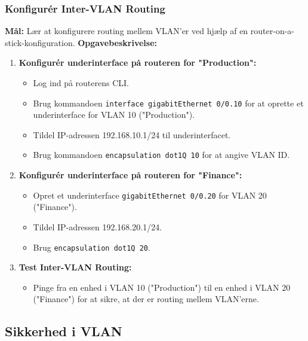 \subsubsection*{Konfigurér Inter-VLAN Routing}
\textbf{Mål:} Lær at konfigurere routing mellem VLAN'er ved hjælp af en router-on-a-stick-konfiguration.
\newline\newline\noindent
\textbf{Opgavebeskrivelse:}
\begin{enumerate}
	\item \textbf{Konfigurér underinterface på routeren for "Production":}
	\begin{itemize}
		\item Log ind på routerens CLI.
		\item Brug kommandoen \texttt{interface gigabitEthernet 0/0.10} for at oprette et underinterface for VLAN 10 ("Production").
		\item Tildel IP-adressen 192.168.10.1/24 til underinterfacet.
		\item Brug kommandoen \texttt{encapsulation dot1Q 10} for at angive VLAN ID.
	\end{itemize}
	\item \textbf{Konfigurér underinterface på routeren for "Finance":}
	\begin{itemize}
		\item Opret et underinterface \texttt{gigabitEthernet 0/0.20} for VLAN 20 ("Finance").
		\item Tildel IP-adressen 192.168.20.1/24.
		\item Brug \texttt{encapsulation dot1Q 20}.
	\end{itemize}
	\item \textbf{Test Inter-VLAN Routing:}
	\begin{itemize}
		\item Pinge fra en enhed i VLAN 10 ("Production") til en enhed i VLAN 20 ("Finance") for at sikre, at der er routing mellem VLAN'erne.
	\end{itemize}
\end{enumerate}

\subsection{Sikkerhed i VLAN}

